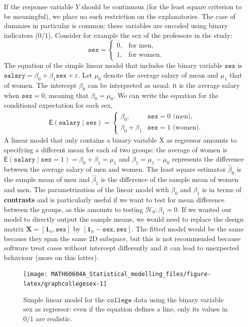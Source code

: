 \documentclass[
  11pt,
  letterpaper,
]{book}
\theoremstyle{definition}
\theoremstyle{definition}
\theoremstyle{definition}
\theoremstyle{remark}
\begin{document}
If the response variable \(Y\) should be continuous (for the least square criterion to be meaningful), we place no such restriction on the explanatories. The case of dummies in particular is common: these variables are encoded using binary indicators (\(0/1\)). Consider for example the sex of the professors in the study:
\[\texttt{sex} = \begin{cases} 0 , & \text{for men},\\
1, & \text{for women.}
\end{cases}
\]
The equation of the simple linear model that includes the binary variable \(\texttt{sex}\) is \(\texttt{salary} = \beta_0 + \beta_1 \texttt{sex} + \varepsilon\). Let \(\mu_0\) denote the average salary of mean and \(\mu_1\) that of women. The intercept \(\beta_0\) can be interpreted as usual: it is the average salary when \(\texttt{sex}=0\), meaning that \(\beta_0=\mu_0\). We can write the equation for the conditional expectation for each sex,
\begin{align*}
\mathsf{E}(\texttt{salary} \mid \texttt{sex})= \begin{cases}
\beta_0, & \texttt{sex}=0 \text{ (men)}, \\
\beta_0 + \beta_1 & \texttt{sex}=1 \text{ (women)}.
\end{cases}
\end{align*}
A linear model that only contains a binary variable \(\mathrm{X}\) as regressor amounts to specifying a different mean for each of two groups: the average of women is \(\mathsf{E}(\texttt{salary} \mid \texttt{sex}=1) = \beta_0 + \beta_1 = \mu_1\) and \(\beta_1=\mu_1-\mu_0\) represents the difference between the average salary of men and women. The least square estimator \(\widehat{\beta}_0\) is the sample mean of men and \(\widehat{\beta}_1\) is the difference of the sample mean of women and men. The parametrization of the linear model with \(\beta_0\) and \(\beta_1\) is in terms of \textbf{contrasts} and is particularly useful if we want to test for mean difference between the groups, as this amounts to testing \(\mathscr{H}_0: \beta_1=0\). If we wanted our model to directly output the sample means, we would need to replace the design matrix \(\mathbf{X}=[\mathbf{1}_n, \texttt{sex}]\) by \([\mathbf{1}_n- \texttt{sex}, \texttt{sex}]\). The fitted model would be the same because they span the same 2D subspace, but this is not recommended because software treat cases without intercept differently and it can lead to unexpected behaviour (more on this latter).

\begin{figure}

{\centering \texttt{[image: MATH60604A\_Statistical\_modelling\_files/figure-latex/graphcollegesex-1]} 

}

\caption{Simple linear model for the $\texttt{college}$ data using the binary variable sex as regressor: even if the equation defines a line, only its values in $0/1$ are realistic.}\label{fig:graphcollegesex}
\end{figure}
\end{document}
